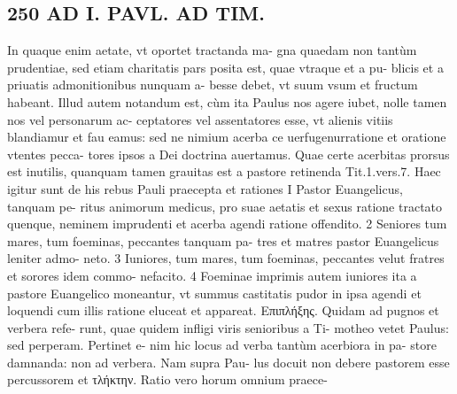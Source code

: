 \documentclass{article}
\begin{document}
\begin{pages}
\section*{250 AD I. PAVL. AD TIM. }\pstart In quaque enim aetate, vt oportet tractanda ma- gna quaedam non tantùm prudentiae, sed etiam charitatis pars posita est, quae vtraque et a pu- blicis et a priuatis admonitionibus nunquam a- besse debet, vt suum vsum et fructum habeant.  \pend\pstart Illud autem notandum est, cùm ita Paulus nos agere iubet, nolle tamen nos vel personarum ac- ceptatores vel assentatores esse, vt alienis vitiis blandiamur et fau eamus: sed ne nimium acerba ce uerfugenurratione et oratione vtentes pecca- tores ipsos a Dei doctrina auertamus. Quae certe acerbitas prorsus est inutilis, quanquam tamen grauitas est a pastore retinenda Tit.1.vers.7.  \pend\pstart Haec igitur sunt de his rebus Pauli praecepta et rationes I Pastor Euangelicus, tanquam pe- ritus animorum medicus, pro suae aetatis et sexus ratione tractato quenque, neminem imprudenti et acerba agendi ratione offendito. 2 Seniores tum mares, tum foeminas, peccantes tanquam pa- tres et matres pastor Euangelicus leniter admo- neto. 3 Iuniores, tum mares, tum foeminas, peccantes velut fratres et sorores idem commo- nefacito. 4 Foeminae imprimis autem iuniores ita a pastore Euangelico moneantur, vt summus castitatis pudor in ipsa agendi et loquendi cum illis ratione eluceat et appareat.  \pend\pstart Επιπλήξης. Quidam ad pugnos et verbera refe- runt, quae quidem infligi viris senioribus a Ti- motheo vetet Paulus: sed perperam. Pertinet e- nim hic locus ad verba tantùm acerbiora in pa- store damnanda: non ad verbera. Nam supra Pau- lus docuit non debere pastorem esse percussorem et τλήκτην. Ratio vero horum omnium praece-  \pend

\end{pages}
\end{document}
